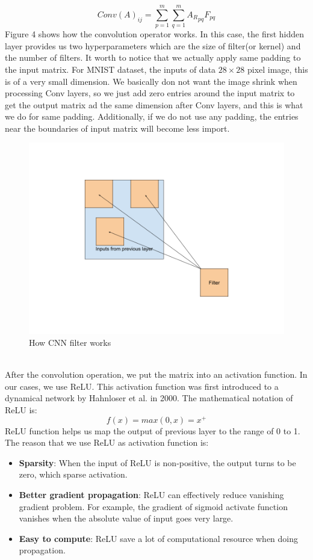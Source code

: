 \documentclass[12pt]{article}
\begin{document}
$$Conv(A)_{ij} = \displaystyle\sum_{p=1}^{m}  \displaystyle\sum_{q=1}^{m} {A_R}_{pq}F_{pq}$$Figure 4 shows how the convolution operator works. In this case, the first hidden layer provides us two hyperparameters which are the size of filter(or kernel) and the number of filters. It worth to notice that we actually apply same padding to the input matrix. For MNIST dataset, the inputs of data $28 \times 28$ pixel image, this is of a very small dimension. We basically don not want the image shrink when processing Conv layers, so we just add zero entries around the input matrix to get the output matrix ad the same dimension after Conv layers, and this is what we do for same padding. Additionally, if we do not  use any padding, the entries near the boundaries of input matrix will become less import.\\
\begin{figure}
\begin{center}
\includegraphics[width =5.7in]{filter.png}
\caption{How CNN filter works}
\end{center}
\label{fig:pic4}
\end{figure}
~\\
After the convolution operation, we put the matrix into an activation function. In our cases, we use ReLU. This activation function was first introduced to a dynamical network by Hahnloser et al. in 2000. The mathematical notation of ReLU is:
$$f(x) = max(0, x) = x^+$$
ReLU function helps us map the output of previous layer to the range of 0 to 1. The reason that we use ReLU as activation function is:
\begin{itemize}
  \item \textbf{Sparsity}: When the input of ReLU is non-positive, the output turns to be zero, which sparse activation.
  \item \textbf{Better gradient propagation}: ReLU can effectively reduce vanishing gradient problem. For example, the gradient of sigmoid activate function vanishes when the absolute value of input goes very large.
  \item \textbf{Easy to compute}: ReLU save a lot of computational resource when doing propagation.
 \end{itemize}
\end{document}
